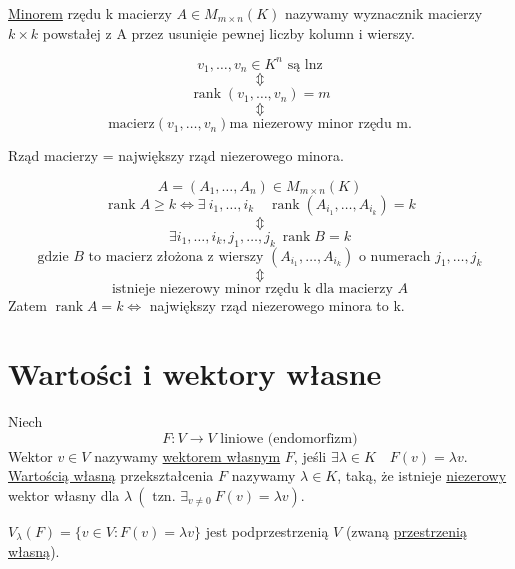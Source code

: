 \begin{df} 
    \underline{Minorem} rzędu k macierzy $ A \in M_{m \times n} (K) $ nazywamy wyznacznik macierzy $ k \times k $ powstałej z A przez usunięie pewnej liczby kolumn i wierszy.
\end{df} 

\begin{ft}
    $$ v_1,\dots,v_n \in K^n \text{ są lnz} $$ 
    $$ \Updownarrow $$ 
    $$\operatorname{rank} (v_1,\dots,v_n) = m$$
    $$ \Updownarrow $$ 
    $$\text{macierz} (v_1,\dots,v_n) \text{ma niezerowy minor rzędu m.}$$
\end{ft}

\begin{ft} 
    Rząd macierzy = największy rząd niezerowego minora. 
\end{ft} 

\begin{dd} 
    $$ A = (A_1,\dots, A_n) \in M_{m \times n } (K) $$ 
    $$ \operatorname{rank}A \ge k \Leftrightarrow \exists \ i_1,\dots,i_k \quad \operatorname{rank} (A_{i_1},\dots,A_{i_k}) = k $$
    $$ \Updownarrow $$ 
    $$ \exists i_1,\dots,i_k,j_1,\dots,j_k \ \operatorname{rank} B = k $$
    $$ \text{gdzie } B \text{ to macierz złożona z wierszy } (A_{i_1},\dots,A_{i_k}) \text{ o numerach } j_1,\dots,j_k$$
    $$ \Updownarrow $$ 
    $$\text{istnieje niezerowy minor rzędu k dla macierzy } A$$
    Zatem $\operatorname{rank}A = k \Leftrightarrow$ największy rząd niezerowego minora to k. 
\end{dd} 

\section{Wartości i wektory własne} 

\begin{df} 
    Niech
    $$ F : V \rightarrow V \text{ liniowe (endomorfizm)}$$
    Wektor $v \in V $ nazywamy \underline{wektorem własnym} $F$, jeśli $\exists \lambda \in K \quad F(v) = \lambda v.$
    \underline{Wartością własną} przekształcenia $F$ nazywamy $\lambda \in K$, taką, że istnieje \underline{niezerowy} wektor własny dla $\lambda \ (\text{ tzn. } \exists_{v \neq 0} \ F(v) = \lambda v)$.
\end{df} 


\begin{ft}
    $V_{\lambda}(F) = \{ v \in V : F(v) = \lambda v\} $ jest podprzestrzenią $V$ (zwaną \underline{przestrzenią własną}). 
\end{ft} 

